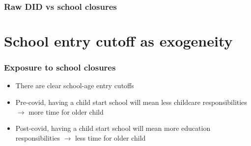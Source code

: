 \documentclass{beamer}
\begin{document}
\begin{frame}
    \label{update_scott}
    \frametitle{Raw DID vs school closures}
        {
    }
\end{frame}







\section{School entry cutoff as exogeneity}

\begin{frame}
    \label{update_scott}
    \frametitle{Exposure to school closures}
    \begin{itemize}
        \item There are clear school-age entry cutoffs
        \item Pre-covid, having a child start school will mean less childcare responsibilities $\rightarrow$ more time for older child
        \item Post-covid, having a child start school will mean more education responsibilities $\rightarrow$ less time for older child
    \end{itemize}
\end{frame}
\end{document}
